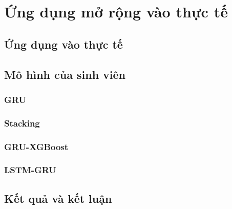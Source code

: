 \chapter{Ứng dụng mở rộng vào thực tế}
\section{Ứng dụng vào thực tế} %
\section{Mô hình của sinh viên} 
\subsection{GRU}
\subsection{Stacking}
\subsection{GRU-XGBoost} %
\subsection{LSTM-GRU} %

\section{Kết quả và kết luận}
